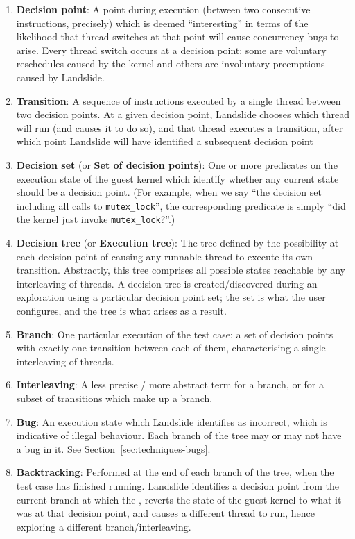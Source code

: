 \begin{enumerate}
	\item {\bf Decision point}:
		A point during execution (between two consecutive instructions, precisely) which is deemed ``interesting'' in terms of the likelihood that thread switches at that point will cause concurrency bugs to arise. Every thread switch occurs at a decision point; some are voluntary reschedules caused by the kernel and others are involuntary preemptions caused by Landslide.
	\item {\bf Transition}:
		A sequence of instructions executed by a single thread between two decision points. At a given decision point, Landslide chooses which thread will run (and causes it to do so), and that thread executes a transition, after which point Landslide will have identified a subsequent decision point
	\item {\bf Decision set} (or {\bf Set of decision points}):
		One or more predicates on the execution state of the guest kernel which identify whether any current state should be a decision point. (For example, when we say ``the decision set including all calls to \texttt{mutex\_lock}'', the corresponding predicate is simply ``did the kernel just invoke \texttt{mutex\_lock}?''.)
	\item {\bf Decision tree} (or {\bf Execution tree}):
		The tree defined by the possibility at each decision point of causing any runnable thread to execute its own transition. Abstractly, this tree comprises all possible states reachable by any interleaving of threads.
		A decision tree is created/discovered during an exploration using a particular decision point set; the set is what the user configures, and the tree is what arises as a result.
	\item {\bf Branch}:
		One particular execution of the test case; a set of decision points with exactly one transition between each of them, characterising a single interleaving of threads.
	\item {\bf Interleaving}:
		A less precise / more abstract term for a branch, or for a subset of transitions which make up a branch.
	\item {\bf Bug}: An execution state which Landslide identifies as incorrect, which is indicative of illegal behaviour. Each branch of the tree may or may not have a bug in it. See Section~\ref{sec:techniques-bugs}.
	\item {\bf Backtracking}:
		Performed at the end of each branch of the tree, when the test case has finished running. Landslide identifies a decision point from the current branch at which the , reverts the state of the guest kernel to what it was at that decision point, and causes a different thread to run, hence exploring a different branch/interleaving.

\end{enumerate}
